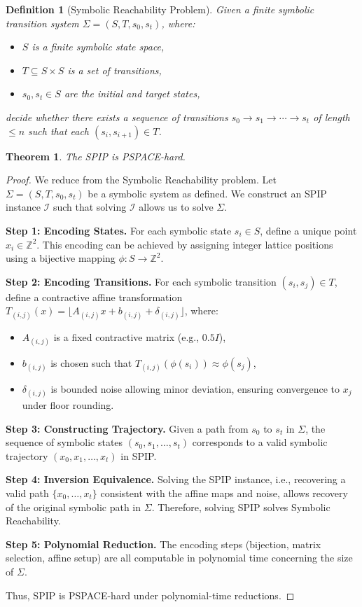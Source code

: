 \documentclass[twocolumn,10pt]{article}
\newtheorem{definition}{Definition}
\newtheorem{theorem}{Theorem}
\begin{document}
\begin{definition}[Symbolic Reachability Problem]
Given a finite symbolic transition system $\Sigma = (S, T, s_0, s_t)$, where:
\begin{itemize}
  \item $S$ is a finite symbolic state space,
  \item $T \subseteq S \times S$ is a set of transitions,
  \item $s_0, s_t \in S$ are the initial and target states,
\end{itemize}
decide whether there exists a sequence of transitions $s_0 \rightarrow s_1 \rightarrow \cdots \rightarrow s_t$ of length $\leq n$ such that each $(s_i, s_{i+1}) \in T$.
\end{definition}

\begin{theorem}
The SPIP is PSPACE-hard.
\end{theorem}

\begin{proof}
We reduce from the Symbolic Reachability problem. Let $\Sigma = (S, T, s_0, s_t)$ be a symbolic system as defined. We construct an SPIP instance $\mathcal{I}$ such that solving $\mathcal{I}$ allows us to solve $\Sigma$.

\textbf{Step 1: Encoding States.} For each symbolic state $s_i \in S$, define a unique point $x_i \in \mathbb{Z}^2$. This encoding can be achieved by assigning integer lattice positions using a bijective mapping $\phi: S \rightarrow \mathbb{Z}^2$.

\textbf{Step 2: Encoding Transitions.} For each symbolic transition $(s_i, s_j) \in T$, define a contractive affine transformation $T_{(i,j)}(x) = \lfloor A_{(i,j)} x + b_{(i,j)} + \delta_{(i,j)} \rfloor$, where:
\begin{itemize}
  \item $A_{(i,j)}$ is a fixed contractive matrix (e.g., $0.5I$),
  \item $b_{(i,j)}$ is chosen such that $T_{(i,j)}(\phi(s_i)) \approx \phi(s_j)$,
  \item $\delta_{(i,j)}$ is bounded noise allowing minor deviation, ensuring convergence to $x_j$ under floor rounding.
\end{itemize}

\textbf{Step 3: Constructing Trajectory.} Given a path from $s_0$ to $s_t$ in $\Sigma$, the sequence of symbolic states $(s_0, s_1, \dots, s_t)$ corresponds to a valid symbolic trajectory $(x_0, x_1, \dots, x_t)$ in SPIP.

\textbf{Step 4: Inversion Equivalence.} Solving the SPIP instance, i.e., recovering a valid path $\{x_0, \dots, x_t\}$ consistent with the affine maps and noise, allows recovery of the original symbolic path in $\Sigma$. Therefore, solving SPIP solves Symbolic Reachability.

\textbf{Step 5: Polynomial Reduction.} The encoding steps (bijection, matrix selection, affine setup) are all computable in polynomial time concerning the size of $\Sigma$.

Thus, SPIP is PSPACE-hard under polynomial-time reductions.
\end{proof}
\end{document}
